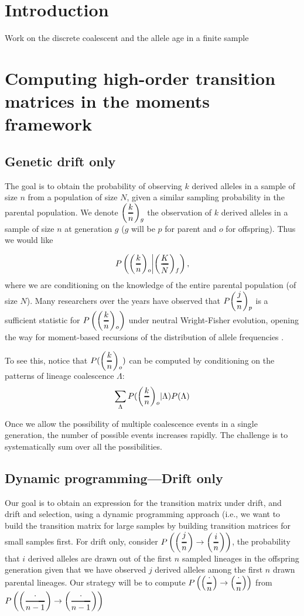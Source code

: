 \documentclass[]{article}
\newcommand{\Dfrac}[2]{%
  \ooalign{%
    $\left(\genfrac{}{}{1.2pt}0{#1}{#2}\right)$\cr%
    $\color{white}\genfrac{}{}{.4pt}0{\phantom{#1}}{\phantom{#2}}$}%
}
\begin{document}
\section{Introduction}
\label{sec:intro}

Work on the discrete coalescent and the allele age in a finite sample
\section{Computing high-order transition matrices in the moments framework}
\subsection{Genetic drift only}
The goal is to obtain the probability of observing $k$ derived alleles in a sample of size $n$ from a population of size $N$, given a similar sampling probability in the parental population. We denote $\Dfrac{k}{n}_g$ the observation of $k$ derived alleles in a sample of size $n$ at generation $g$ ($g$ will be $p$ for parent and $o$ for offspring).  Thus we would like 

$$P\left(\Dfrac{k}{n}_o \middle|  \Dfrac{K}{N}_f \right),$$ where we are conditioning on the knowledge of the entire parental population (of size $N$). Many researchers over the years have observed that $P\Dfrac{j}{n}_p$ is a sufficient statistic for  $P\left(\Dfrac{k}{n}_o\right)$ under neutral Wright-Fisher evolution, opening the way for moment-based recursions of the distribution of allele frequencies \cite{Kimura, Ewens, Song, Jouganous, Kurtz-Donnely}.

To see this, notice that $P(\Dfrac{k}{n}_o)$ can be computed by conditioning on the patterns of lineage coalescence $\Lambda$:
$$\sum_\Lambda P(\Dfrac{k}{n}_o | \Lambda) P(\Lambda)$$


 

Once we allow the possibility of multiple coalescence events in a single generation, the number of possible events increases rapidly. The challenge is to systematically sum over all the possibilities. 

\subsection{Dynamic programming---Drift only}
Our goal is to obtain an expression for the transition matrix under drift, and drift and selection, using a dynamic programming approach (i.e., we want to build the transition matrix for large samples by building transition matrices for small samples first. For drift only, consider $P\left(\Dfrac{j}{n} \rightarrow \Dfrac{i}{n} \right)$, the probability that $i$ derived alleles are drawn out of the first $n$ sampled lineages in the offspring generation given that we have observed $j$ derived alleles among the first $n$ drawn parental lineages. Our strategy will be to compute $P\left(\Dfrac{\cdot}{n} \rightarrow \Dfrac{\cdot}{n} \right)$ from $P\left(\Dfrac{\cdot}{n-1} \rightarrow \Dfrac{\cdot}{n-1} \right)$
\end{document}
